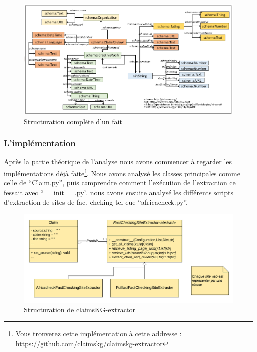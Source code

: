 \documentclass[oneside,13pt,a4paper]{report}
\begin{document}
\begin{figure}[h]
	\centering
	\begin{minipage}[c]{.95\linewidth}
		\includegraphics[width=1\textwidth]{img/claimKG.png}
		\caption{Structuration complète d'un fait}
	\end{minipage}
\end{figure}


\subsubsection*{L'implémentation}

Après la partie théorique de l'analyse nous avons commencer à regarder les implémentations déjà faite\footnote{Vous trouverez cette implémentation à cette addresse : \url{https://github.com/claimskg/claimskg-extractor}}. Nous avons analysé les classes principales comme celle de \enquote{Claim.py}, puis comprendre comment l'exécution de l'extraction ce fessait avec \enquote{\_\_init\_\_.py}. nous avons ensuite analysé les différents scripts d'extraction de sites de fact-cheking tel que \enquote{africacheck.py}.

\begin{figure}[h]
	\centering
	\begin{minipage}[c]{.8\linewidth}
		\includegraphics[width=1\textwidth]{img/claimsKG-extractor-uml.png}
		\caption{Structuration de claimsKG-extractor}
	\end{minipage}
\end{figure}
\end{document}
